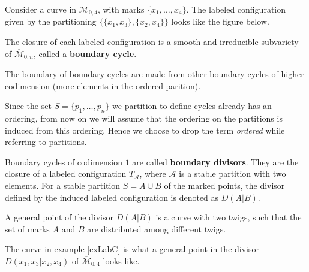 \begin{example}
    \label{exLabC}
    Consider a curve in $\overline{\mathcal{M}}_{0,4}$, with marks $\{x_{1},\dots, x_{4}\}$. 
    The labeled configuration given by the partitioning $\{\{x_{1}, x_{3}\},\{x_{2}, x_{4}\}\}$ looks like the figure below.
    \begin{center}
    \end{center}
\end{example}

\begin{definition}
    The closure of each labeled configuration is a smooth and irreducible subvariety of $\overline{\mathcal{M}}_{0,n}$, called a \textbf{boundary cycle}.
    \par The boundary of boundary cycles are made from other boundary cycles of higher codimension (more elements in the ordered parition).
\end{definition}

\begin{remark}
    Since the set $S = \{p_{1}, \dots, p_{n}\}$ we partition to define cycles already has an ordering, from now on we will assume that the ordering on the partitions is induced from this ordering. Hence we choose to drop the term \textit{ordered} while referring to partitions.
\end{remark}

\begin{definition}
    Boundary cycles of codimension $1$ are called \textbf{boundary divisors}. 
    They are the closure of a labeled configuration $T_{\mathcal{A}}$, where $\mathcal{A}$ is a stable partition with two elements.
    For a stable partition $S = A \cup B$ of the marked points, the divisor defined by the induced labeled configuration is denoted as $D(A|B)$.
    \par A general point of the divisor $D(A|B)$ is a curve with two twigs, such that the set of marks $A$ and $B$ are distributed among different twigs.
\end{definition}
The curve in example \ref{exLabC} is what a general point in the divisor $D(x_{1},x_{3}|x_{2},x_{4})$ of $\overline{\mathcal{M}}_{0,4}$ looks like.


